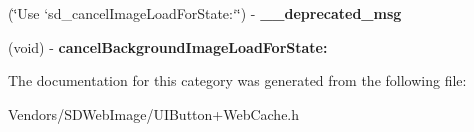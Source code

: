 \begin{DoxyCompactItemize}
\item 
\hypertarget{category_u_i_button_07_web_cache_deprecated_08_ac9c0b556cb6bb0fbc754731fc11cda71}{}(\char`\"{}Use `sd\+\_\+cancel\+Image\+Load\+For\+State\+:`\char`\"{}) -\/ {\bfseries \+\_\+\+\_\+deprecated\+\_\+msg}\label{category_u_i_button_07_web_cache_deprecated_08_ac9c0b556cb6bb0fbc754731fc11cda71}

\item 
\hypertarget{category_u_i_button_07_web_cache_deprecated_08_a5aad18d7bd7dc24fa75bc7150e8e0fc9}{}(void) -\/ {\bfseries cancel\+Background\+Image\+Load\+For\+State\+:}\label{category_u_i_button_07_web_cache_deprecated_08_a5aad18d7bd7dc24fa75bc7150e8e0fc9}

\end{DoxyCompactItemize}


The documentation for this category was generated from the following file\+:\begin{DoxyCompactItemize}
\item 
Vendors/\+S\+D\+Web\+Image/U\+I\+Button+\+Web\+Cache.\+h\end{DoxyCompactItemize}
